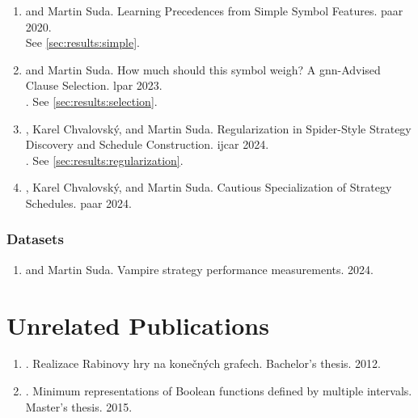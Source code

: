 \begin{enumerate}

\item {} and Martin Suda. Learning Precedences from Simple Symbol Features. \Gls{paar} 2020. \cite{DBLP:conf/cade/Bartek020}
\\
See \cref{sec:results:simple}.

\item {} and Martin Suda. How much should this symbol weigh? A \acrshort{gnn}-Advised Clause Selection. \Gls{lpar} 2023. \cite{DBLP:conf/lpar/Bartek023}
\\
. See \cref{sec:results:selection}.

\item {}, Karel Chvalovský, and Martin Suda. Regularization in Spider-Style Strategy Discovery and Schedule Construction. \Gls{ijcar} 2024. \cite{DBLP:conf/ijcar/BartekCS24}
\\
. See \cref{sec:results:regularization}.

\item {}, Karel Chvalovský, and Martin Suda. Cautious Specialization of Strategy Schedules. \Gls{paar} 2024. \cite{DBLP:conf/paar/BartekC024}

\end{enumerate}


\subsubsection{Datasets}

\begin{enumerate}
\item {} and Martin Suda. Vampire strategy performance measurements. 2024. \cite{bartek10814478}
\end{enumerate}

\section{Unrelated Publications}

\begin{enumerate}
\item {}. \foreignlanguage{czech}{Realizace Rabinovy hry na konečných grafech}. Bachelor's thesis. 2012. \cite{Bartek2012thesis}
\item {}. Minimum representations of Boolean functions defined by multiple intervals. Master's thesis. 2015. \cite{bartek2015}
\end{enumerate}

